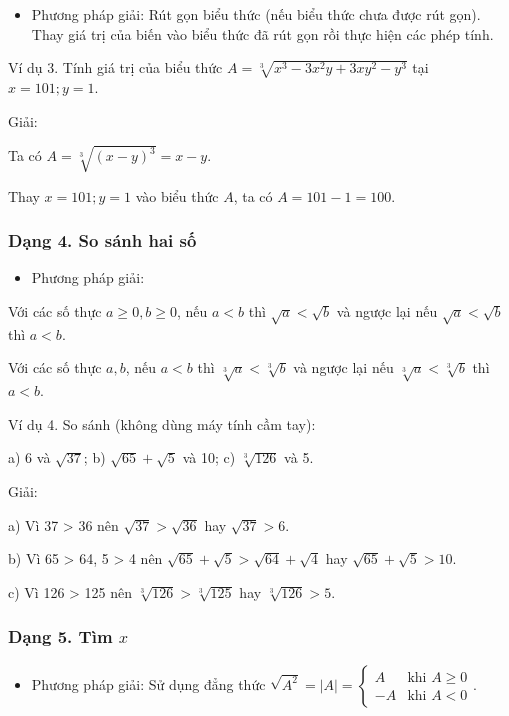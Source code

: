 \documentclass[%
    fontsize=12pt,%
    chapterprefix=false,%
    open=right,%
    twoside=false,%
    numbers=noenddot,%
    headings=optiontohead,%
    final,%
    DIV=15,%
    parskip=half %
]{scrbook}
\begin{document}
\begin{itemize}
  \item Phương pháp giải: Rút gọn biểu thức (nếu biểu thức chưa được rút gọn). Thay giá trị của biến vào biểu thức đã rút gọn rồi thực hiện các phép tính.
\end{itemize}

Ví dụ 3. Tính giá trị của biểu thức $ A = \sqrt[3]{x^3 - 3x^2y + 3xy^2 - y^3} $ tại $ x = 101; y = 1 $.

Giải:

Ta có $ A = \sqrt[3]{(x - y)^3} = x - y $.

Thay $ x = 101; y = 1 $ vào biểu thức $ A $, ta có $ A = 101 - 1 = 100 $.
\subsubsection{Dạng 4. So sánh hai số}

\begin{itemize}
  \item Phương pháp giải:
\end{itemize}

Với các số thực $ a \geq 0, b \geq 0 $, nếu $ a < b $ thì $ \sqrt{a} < \sqrt{b} $ và ngược lại nếu $ \sqrt{a} < \sqrt{b} $ thì $ a < b $.

Với các số thực $ a, b $, nếu $ a < b $ thì $ \sqrt[3]{a} < \sqrt[3]{b} $ và ngược lại nếu $ \sqrt[3]{a} < \sqrt[3]{b} $ thì $ a < b $.

Ví dụ 4. So sánh (không dùng máy tính cầm tay):

a) 6 và $ \sqrt{37} $;        b) $ \sqrt{65} + \sqrt{5} $ và 10;        c) $ \sqrt[3]{126} $ và 5.

Giải:

a) Vì 37 > 36 nên $ \sqrt{37} > \sqrt{36} $ hay $ \sqrt{37} > 6 $.

b) Vì 65 > 64, 5 > 4 nên $ \sqrt{65} + \sqrt{5} > \sqrt{64} + \sqrt{4} $ hay $ \sqrt{65} + \sqrt{5} > 10 $.

c) Vì 126 > 125 nên $ \sqrt[3]{126} > \sqrt[3]{125} $ hay $ \sqrt[3]{126} > 5 $.
\subsubsection{Dạng 5. Tìm $ x $}

\begin{itemize}
  \item Phương pháp giải: Sử dụng đẳng thức $ \sqrt{A^2} = |A| = \begin{cases} A & \text{khi } A \geq 0 \\ -A & \text{khi } A < 0 \end{cases} $.
\end{itemize}
\end{document}
